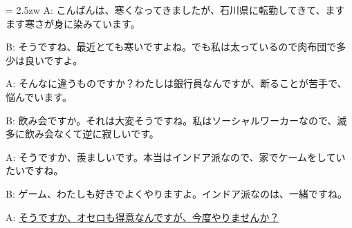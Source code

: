 \documentclass[11pt]{amsart}
\title{}
\author{}
\newenvironment{hangall}[1]{\hangindent = 2.5zw\everypar{\hangindent = 2.5zw}}{}
\begin{document}
\maketitle
\begin{hangall}{}%
A: こんばんは、寒くなってきましたが、石川県に転勤してきて、ますます寒さが身に染みています。

B: そうですね、最近とても寒いですよね。でも私は太っているので肉布団で多少は良いですよ。

A: そんなに違うものですか？わたしは銀行員なんですが、断ることが苦手で、悩んでいます。

B: 飲み会ですか。それは大変そうですね。私はソーシャルワーカーなので、滅多に飲み会なくて逆に寂しいです。

A: そうですか、羨ましいです。本当はインドア派なので、家でケームをしていたいですね。

B: ゲーム、わたしも好きでよくやりますよ。インドア派なのは、一緒ですね。

A: \ul{そうですか、オセロも得意なんですが、今度やりませんか？}\end{hangall}
\end{document}
